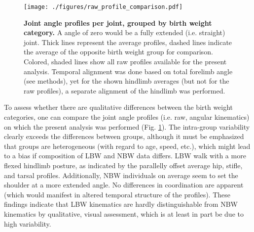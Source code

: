 \bigskip

\begin{figure}[p]
\centering
\texttt{[image: ./figures/raw\_profile\_comparison.pdf]}
\caption{\label{fig:raw_data}\textbf{Joint angle profiles per joint, grouped by birth weight category.} A  angle of zero would be a fully extended (i.e. straight) joint. Thick lines represent the average profiles, dashed lines indicate the average of the opposite birth weight group for comparison. Colored, shaded lines show all raw profiles available for the present analysis. Temporal alignment was done based on total forelimb angle (see methods), yet for the shown hindlimb averages (but not for the raw profiles), a separate alignment of the hindlimb was performed.}
\end{figure}

To assess whether there are qualitative differences between the birth weight categories, one can compare the joint angle profiles (i.e. raw, angular kinematics) on which the present analysis was performed (Fig. \ref{fig:raw_data}).
The intra-group variability clearly exceeds the differences between groups, although it must be emphasized that groups are heterogeneous (with regard to age, speed, etc.), which might lead to a bias if composition of LBW and NBW data differs.
LBW walk with a more flexed hindlimb posture, as indicated by the parallelly offset average hip, stifle, and tarsal profiles.
Additionally, NBW individuals on average seem to set the shoulder at a more extended  angle.
No differences in coordination are apparent (which would manifest in altered temporal structure of the profiles).
These findings indicate that LBW kinematics are hardly distinguishable from NBW kinematics by qualitative, visual assessment, which is at least in part be due to high variability.



\bigskip


